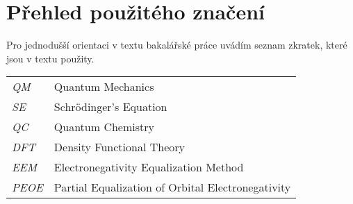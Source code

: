 \chapter*{Přehled použitého značení}

Pro jednodušší orientaci v textu bakalářské práce uvádím seznam zkratek, které jsou v textu použity.
\begin{flushleft}
\begin{longtable}[l]{ll} %
  \textit{QM}                 & Quantum Mechanics
  \\[1mm]
  \textit{SE}                 & Schrödinger's Equation
  \\[1mm]
  \textit{QC }                & Quantum Chemistry
  \\[1mm]
  \textit{DFT}                & Density Functional Theory
  \\[1mm]
  \textit{EEM}                 & Electronegativity Equalization Method
  \\[1mm]
  \textit{PEOE}                 & Partial Equalization of Orbital Electronegativity
  \\[1mm]

\end{longtable}
\end{flushleft}
